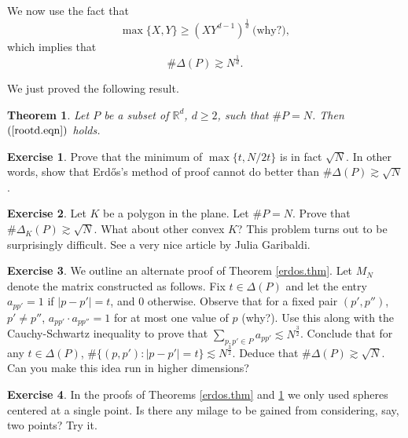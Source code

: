 \documentclass[]{amsart}
\numberwithin{equation}{section}
\theoremstyle{plain}
\newtheorem{theorem}{Theorem}[section]
\theoremstyle{definition}
\newtheorem{exercise}{Exercise}[section]
\theoremstyle{remark}
\begin{document}
We now use the fact that
\begin{equation}
\max \{X,Y\} \ge
{(XY^{d-1})}^{\frac{1}{d}} \ \text{(why?)},
\end{equation} which
implies that
\begin{equation} \label{rootd.eqn}
\# \Delta(P) \gtrsim N^{\frac{1}{d}}.
\end{equation}


We just proved the following result.

\begin{theorem} \label{higherdimerdos.thm}
Let $P$ be a subset of $\mathbb{R}^d$, $d \ge
2$, such that $\# P=N$. Then $(\ref{rootd.eqn})$ holds. \end{theorem}


\begin{exercise}  \label{ex1.1}
Prove that the minimum of $\max \{t, N/2t\}$ is in fact $\sqrt{N}$.  In other words, show that Erd\H{o}s's method of proof cannot do better than $\# \Delta(P) \gtrsim \sqrt{N}$. \end{exercise}

\begin{exercise} \label{ex1.2}
Let $K$ be a polygon in the plane. Let $\#
P=N$. Prove that $\# \Delta_K(P) \gtrsim \sqrt{N}$. What about
other convex $K$? This problem turns out to be surprisingly difficult.
See a very nice article by Julia Garibaldi. \end{exercise}

\begin{exercise} \label{ex1.3}
We outline an alternate proof of Theorem \ref{erdos.thm}. Let $M_N$ denote the matrix constructed as follows. Fix $t
\in \Delta(P)$ and let the entry $a_{pp'}=1$ if $|p-p'|=t$, and
$0$ otherwise. Observe that for a fixed pair $(p',p'')$, $p'
\not=p''$, $a_{pp'} \cdot a_{pp''}=1$ for at most one value of $p$
(why?). Use this along with the Cauchy-Schwartz inequality to
prove that $\sum_{p,p' \in P} a_{pp'} \lesssim N^{\frac{3}{2}}$.
Conclude that for any $t \in \Delta(P)$, $\# \{(p,p'): |p-p'|=t\}
\lesssim N^{\frac{3}{2}}$. Deduce that $\# \Delta(P) \gtrsim
\sqrt{N}$. Can you make this idea run in higher dimensions?
\end{exercise}

\begin{exercise} \label{ex1.4}
In the proofs of Theorems \ref{erdos.thm} and \ref{higherdimerdos.thm} we
only used spheres centered at a single point. Is there any milage
to be gained from considering, say, two points? Try it.
\end{exercise}
\end{document}
